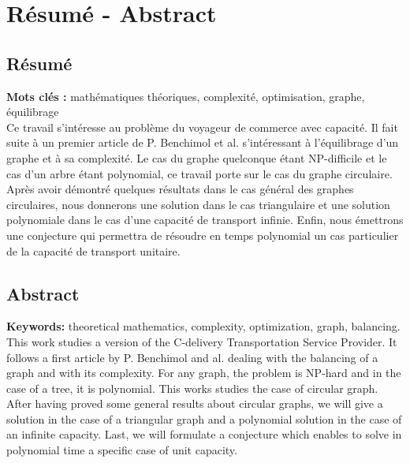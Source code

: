 \chapter*{Résumé - Abstract}

\section*{Résumé}

\textbf{Mots clés :} mathématiques théoriques, complexité, optimisation, graphe, équilibrage
\\

Ce travail s'intéresse au problème du voyageur de commerce avec capacité. Il fait suite à un premier article de P. Benchimol et al. s'intéressant à l'équilibrage d'un graphe et à sa complexité. Le cas du graphe quelconque étant NP-difficile et le cas d'un arbre étant polynomial, ce travail porte sur le cas du graphe circulaire. Après avoir démontré quelques résultats dans le cas général des graphes circulaires, nous donnerons une solution dans le cas triangulaire et une solution polynomiale dans le cas d'une capacité de transport infinie. Enfin, nous émettrons une conjecture qui permettra de résoudre en temps polynomial un cas particulier de la capacité de transport unitaire.
\\[1cm]

\section*{Abstract}

\textbf{Keywords:} theoretical mathematics, complexity, optimization, graph, balancing.
\\

This work studies a version of the C-delivery Transportation Service Provider. It follows a first article by P. Benchimol and al. dealing with the balancing of a graph and with its complexity. For any graph, the problem is NP-hard and in the case of a tree, it is polynomial. This works studies the case of circular graph. After having proved some general results about circular graphs, we will give a solution in the case of a triangular graph and a polynomial solution in the case of an infinite capacity. Last, we will formulate a conjecture which enables to solve in polynomial time a specific case of unit capacity.
